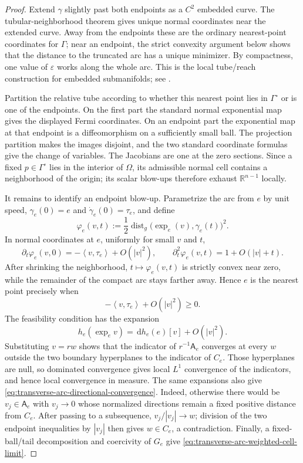 \documentclass[11pt]{amsart}
\numberwithin{equation}{section}
\theoremstyle{definition}
\theoremstyle{remark}
\DeclareMathOperator{\dist}{dist}
\newcommand{\R}{\mathbb{R}}
\newcommand{\dd}{\,\mathrm{d}}
\newcommand{\eps}{\varepsilon}
\newcommand{\Afib}{\mathsf{A}}
\newcommand{\inner}[2]{\left\langle #1,#2\right\rangle}
\begin{document}
\begin{proof}
Extend $\gamma$ slightly past both endpoints as a $C^2$ embedded curve.
The tubular-neighborhood theorem gives unique normal coordinates near the
extended curve.  Away from the endpoints these are the ordinary nearest-point
coordinates for $\Gamma$; near an endpoint, the strict convexity argument below
shows that the distance to the truncated arc has a unique minimizer.  By
compactness, one value of $\eps$ works along the whole arc.  This is the local
tube/reach construction for embedded submanifolds; see
\cite{GrayTubes,Federer}.

Partition the relative tube according to whether this nearest point lies in
$\Gamma^\circ$ or is one of the endpoints.  On the first part the standard
normal exponential map gives the displayed Fermi coordinates.  On an endpoint
part the exponential map at that endpoint is a diffeomorphism on a sufficiently
small ball.  The projection partition makes the images disjoint, and the two
standard coordinate formulas give the change of variables.  The Jacobians are
one at the zero sections.  Since a fixed $p\in\Gamma^\circ$ lies in the interior
of $\Omega$, its admissible normal cell contains a neighborhood of the origin;
its scalar blow-ups therefore exhaust $\R^{n-1}$ locally.

It remains to identify an endpoint blow-up.  Parametrize the arc from $e$ by
unit speed, $\gamma_e(0)=e$ and $\dot\gamma_e(0)=\tau_e$, and define
\[
 \varphi_e(v,t):=\frac12\dist_g\bigl(\exp_e(v),\gamma_e(t)\bigr)^2.
\]
In normal coordinates at $e$, uniformly for small $v$ and $t$,
\[
 \partial_t\varphi_e(v,0)
 =-\inner{v}{\tau_e}+O(|v|^2),
 \qquad
 \partial_t^2\varphi_e(v,t)=1+O(|v|+t).
\]
After shrinking the neighborhood, $t\mapsto\varphi_e(v,t)$ is strictly convex
near zero, while the remainder of the compact arc stays farther away.  Hence
$e$ is the nearest point precisely when
\[
 -\inner{v}{\tau_e}+O(|v|^2)\ge0.
\]
The feasibility condition has the expansion
\[
 h_e(\exp_e v)=\dd h_e(e)[v]+O(|v|^2).
\]
Substituting $v=rw$ shows that the indicator of $r^{-1}\Afib_e$ converges at
every $w$ outside the two boundary hyperplanes to the indicator of $C_e$.
Those hyperplanes are null, so dominated convergence gives local $L^1$
convergence of the indicators, and hence local convergence in measure.  The
same expansions also give
\eqref{eq:transverse-arc-directional-convergence}.  Indeed, otherwise there
would be $v_j\in\Afib_e$ with $v_j\to0$ whose normalized directions remain a
fixed positive distance from $C_e$.  After passing to a subsequence,
$v_j/|v_j|\to w$; division of the two endpoint inequalities by $|v_j|$ then
gives $w\in C_e$, a contradiction.  Finally, a fixed-ball/tail decomposition
and coercivity of $G_e$ give
\eqref{eq:transverse-arc-weighted-cell-limit}.
\end{proof}
\end{document}
